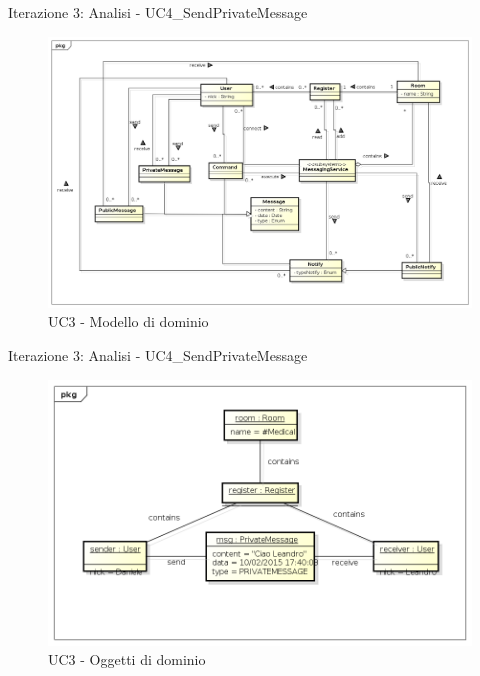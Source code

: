 \documentclass[t]{beamer} %
\begin{document}
\begin{frame} {Iterazione 3: Analisi - UC4\_SendPrivateMessage}
   \begin{figure}
     \includegraphics[scale=0.255]{image_astah/Iteration_3_DomainModel/UC4_SendPrivateMessage_DM.png}{\centering}
     \caption{UC3 - Modello di dominio}
     \label{fig_UC4_SPM_DM} 
   \end{figure}
\end{frame}

\begin{frame} {Iterazione 3: Analisi - UC4\_SendPrivateMessage}
   \begin{figure}
     \includegraphics[scale=0.435]{image_astah/Iteration_3_DomainModel/UC4_SendPrivateMessage_OM.png}{\centering}
     \caption{UC3 - Oggetti di dominio}
     \label{fig_UC4_SPM_OM} 
   \end{figure}
\end{frame}
\end{document}
